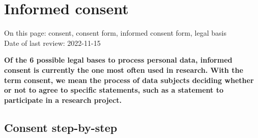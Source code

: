 \documentclass[
]{book}
\begin{document}
\hypertarget{informed-consent-forms}{%
\section{Informed consent}\label{informed-consent-forms}}

On this page: consent, consent form, informed consent form, legal basis\\
Date of last review: 2022-11-15

\textbf{Of the 6 possible legal bases to process personal data, informed consent is
currently the one most often used in research. With the term consent, we mean
the process of data subjects deciding whether or not to agree to specific
statements, such as a statement to participate in a research project.}

\hypertarget{consent-step-by-step}{%
\subsection{Consent step-by-step}\label{consent-step-by-step}}
\end{document}
